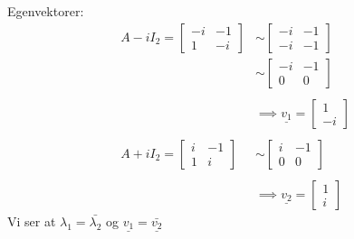\documentclass[11pt, a4paper, norsk]{article}
\begin{document}
\begin{Example}{}{}
            Egenvektorer:
            \begin{align*}
                A - iI_{2} = \begin{bmatrix}
                    -i & -1 \\
                    1 & -i
                \end{bmatrix} &\sim \begin{bmatrix}
                -i & -1 \\
                -i & -1
                \end{bmatrix}
                \\
                &\sim \begin{bmatrix}
                    -i & -1 \\
                    0 & 0
                \end{bmatrix}
                \\
                \\
                &\implies \underline{v_1} = \begin{bmatrix}
                    1 \\
                    -i
                \end{bmatrix}
                \\
                \\
                A + iI_{2} = \begin{bmatrix}
                    i & -1 \\
                    1 & i
                \end{bmatrix} &\sim \begin{bmatrix}
                i & -1 \\
                0 & 0
                \end{bmatrix}
                \\
                \\
                &\implies \underline{v_2} = \begin{bmatrix}
                    1 \\
                    i
                \end{bmatrix}
            \end{align*}
            Vi ser at $\lambda_{1} = \bar{\lambda_2}$ og $\underline{v_1} = \bar{\underline{v_2}}$
        \end{Example}
        
\end{document}
